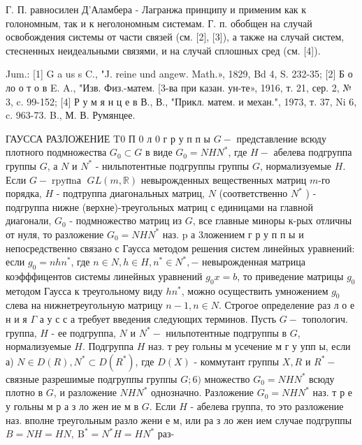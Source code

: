\documentclass[10pt]{article}
\begin{document}
Г. П. равносилен Д'Аламбера - Лагранжа принципу и применим как к голономным, так и к неголономным системам. $Г$. п. обобщен на случай освобождения системы от части связей (см. [2], [3]), а также на случай систем, стесненных неидеальными связями, и на случай сплошных сред (см. [4]).



Jum.: [1] G a us s C., "J. reine und angew. Math.», 1829, Bd 4, S. 232-35; [2] Б о ло о т о в E. A., "Изв. Физ.-матем. [3-ва при казан. ун-те», 1916, т. 21, сер. 2, № 3, c. 99-152; [4] Р у м я н ц е в В., В., "Прикл. матем. и механ.", 1973, т. 37, Ni 6, c. 963-73. B., М. В. Румянцее.



ГАУССА РАЗЛОЖЕНИЕ $\mathrm{T} 0$ П 0 л 0 г р у п п ы $G-$ представление всюду плотного подмножества $G_{0} \subset G$ в виде $G_{0}=N H N^{*}$, где $H-$ абелева подгруппа группы $G$, а $N$ и $N^{*}$ - нильпотентные подгруппы группы $G$, нормализуемые $H$. Если $G-\operatorname{rpyпnа~} G L(m, \mathbb{R})$ невырожденных вещественных матриц $m$-го порядка, $H$ - подтруппа диагональных матриц, $N$ (соответственно $N^{*}$ ) - подгруппа нижне (верхне)-треугольных матриц с единицами на главной диагонали, $G_{0}$ - подмножество матриц из $G$, все главные миноры к-рых отличны от нуля, то разложение $G_{0}=N H N^{*}$ наз. $\mathrm{p}$ а 3ложением г р у п п ы и непосредственно связано с Гаусса методом решения систем линейных уравнений: если $g_{0}=n h n^{*}$, где $n \in N, h \in H, n^{*} \in N^{*},-$ невырожденная матрица коэфффицентов системы линейных уравнений $g_{0} x=b$, то приведение матрицы $g_{0}$ методом Гаусса к треугольному виду $h n^{*}$, можно осуществить умножением $g_{0}$ слева на нижнетреугольную матрицу $n-1, n \in N$. Строгое определение раз л о е н и я $\Gamma$ а у с с а требует введения следующих терминов. Пусть $G-$ топологич. группа, $H$ - ее подгруппа, $N$ и $N^{*}-$ нильпотентные подгруппы в $G$, нормализуемые $H$. Подгруппа $H$ наз. т реу гольны м усечение м г у упп ы, если а) $N \in D(R), N^{*} \subset D\left(R^{*}\right)$, где $D(X)$ - коммутант группы $X, R$ и $R^{*}-$ связные разрешимые подгруппы группы $G ; 6)$ множество $G_{0}=N H N^{*}$ всюду плотно в $G$, и разложение $N H N^{*}$ однозначно. Разложение $G_{0}=N H N^{*}$ наз. т р е у гольны м р а з ло жен ие м в $G$. Если $H$ - абелева группа, то это разложение наз. вполне треугольным разло жени е м, или ра з ло жен ием случае подгруппы $B=N H=H N, \mathrm{~B}^{*}=N^{*} H=H N^{*}$ раз-
\end{document}
